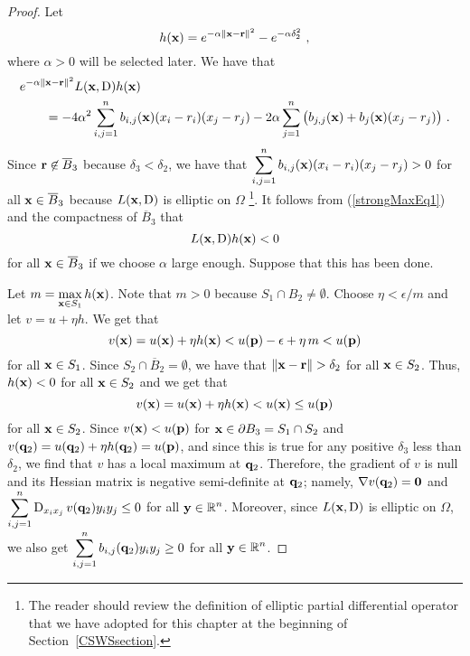 \begin{proof}
Let
\begin{equation} \label{strongMaxEq4}
  h(\mathbf{x}) = e^{-\alpha \|\mathbf{x} - \mathbf{r}\|^2} - e^{-\alpha \delta_2^2} \ ,
\end{equation}
where $\alpha>0$ will be selected later.  We have that
\begin{equation} \label{strongMaxEq1}
\begin{split}
&e^{-\alpha \|\mathbf{x} - \mathbf{r}\|^2} L(\mathbf{x},\operatorname{D}) h (\mathbf{x}) \\
&\qquad = - 4 \alpha^2 \sum_{i,j=1}^n b_{i,j}(\mathbf{x}) (x_i - r_i)(x_j - r_j)
- 2 \alpha \sum_{j=1}^n \big(b_{j,j}(\mathbf{x}) + b_j(\mathbf{x}) (x_j - r_j)\big) \ .
\end{split}
\end{equation}
Since $\mathbf{r} \not\in \overline{B}_3$ because $\delta_3 < \delta_2$, we
have that
$\displaystyle \sum_{i,j=1}^n b_{i,j}(\mathbf{x}) (x_i - r_i)(x_j - r_j) > 0$
for all $\mathbf{x} \in \overline{B}_3$ because
$L(\mathbf{x},\operatorname{D})$ is elliptic on $\Omega$ \footnote{The reader should
review the definition of elliptic partial differential operator
that we have adopted for this chapter at the beginning of
Section~\ref{CSWSsection}.}.  It follows from
(\ref{strongMaxEq1}) and the compactness of $\overline{B}_3$ that 
\begin{equation} \label{strongMaxEq2}
  L(\mathbf{x},\operatorname{D}) h (\mathbf{x})  < 0
\end{equation}
for all $\mathbf{x} \in \overline{B}_3$ if we choose $\alpha$ large
enough.  Suppose that this has been done.

Let $\displaystyle m = \max_{\mathbf{x} \in S_1} h(\mathbf{x})$.  Note that
$m>0$ because $S_1 \cap B_2 \neq \emptyset$.
Choose $\eta < \epsilon/m$ and let $v = u + \eta h$.
We get that
\[
v(\mathbf{x}) = u(\mathbf{x}) + \eta h(\mathbf{x})
< u(\mathbf{p}) - \epsilon + \eta\, m < u(\mathbf{p})
\]
for all $\mathbf{x} \in S_1$.  Since $S_2 \cap \overline{B}_2 = \emptyset$,
we have that $\|\VEC{x} - \VEC{r}\|>\delta_2$ for all
$\mathbf{x} \in S_2$.  Thus, $h(\mathbf{x}) < 0$ for all $\mathbf{x} \in S_2$ and
we get that
\[
v(\mathbf{x}) = u(\mathbf{x}) + \eta h(\mathbf{x}) < u(\mathbf{x}) \leq u(\mathbf{p})
\]
for all $\mathbf{x} \in S_2$.  Since $v(\mathbf{x}) < u(\mathbf{p})$ for
$\mathbf{x} \in \partial B_3 = S_1 \cap S_2$ and
$v(\mathbf{q}_2) = u(\mathbf{q}_2) + \eta h(\mathbf{q}_2) = u(\mathbf{p})$, and
since this is true for any positive $\delta_3$ less than $\delta_2$,
we find that $v$ has a local maximum at $\mathbf{q}_2$.  Therefore,
the gradient of $v$ is null and its Hessian matrix is negative
semi-definite at $\mathbf{q}_2$; namely, $\nabla v(\mathbf{q}_2) = \mathbf{0}$ and 
$\displaystyle \sum_{i,j=1}^n \operatorname{D}_{x_i x_j} v(\mathbf{q}_2) y_i y_j \leq 0$
for all $\displaystyle \mathbf{y} \in \mathbb{R}^n$.  Moreover, since
$L(\mathbf{x},\operatorname{D})$ is elliptic on $\Omega$, we also get
$\displaystyle \sum_{i,j=1}^n b_{i,j}(\mathbf{q}_2) y_i y_j \geq 0$
for all $\displaystyle \mathbf{y} \in \mathbb{R}^n$.


\end{proof}
